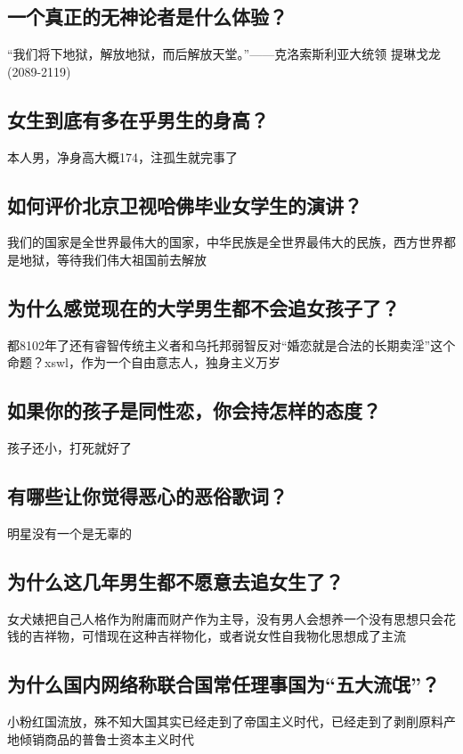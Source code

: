 \documentclass{ctexart}
\begin{document}
		\subsection{一个真正的无神论者是什么体验？}
			“我们将下地狱，解放地狱，而后解放天堂。”——克洛索斯利亚大统领 提琳戈龙(2089-2119)

		\subsection{女生到底有多在乎男生的身高？}
			本人男，净身高大概174，注孤生就完事了

		\subsection{如何评价北京卫视哈佛毕业女学生的演讲？}
			我们的国家是全世界最伟大的国家，中华民族是全世界最伟大的民族，西方世界都是地狱，等待我们伟大祖国前去解放

		\subsection{为什么感觉现在的大学男生都不会追女孩子了？}
			都8102年了还有睿智传统主义者和乌托邦弱智反对“婚恋就是合法的长期卖淫”这个命题？xswl，作为一个自由意志人，独身主义万岁

		\subsection{如果你的孩子是同性恋，你会持怎样的态度？}
			孩子还小，打死就好了

		\subsection{有哪些让你觉得恶心的恶俗歌词？}
			明星没有一个是无辜的

		\subsection{为什么这几年男生都不愿意去追女生了？}
			女犬婊把自己人格作为附庸而财产作为主导，没有男人会想养一个没有思想只会花钱的吉祥物，可惜现在这种吉祥物化，或者说女性自我物化思想成了主流

		\subsection{为什么国内网络称联合国常任理事国为“五大流氓”？}
			小粉红国流放，殊不知大国其实已经走到了帝国主义时代，已经走到了剥削原料产地倾销商品的普鲁士资本主义时代
\end{document}
